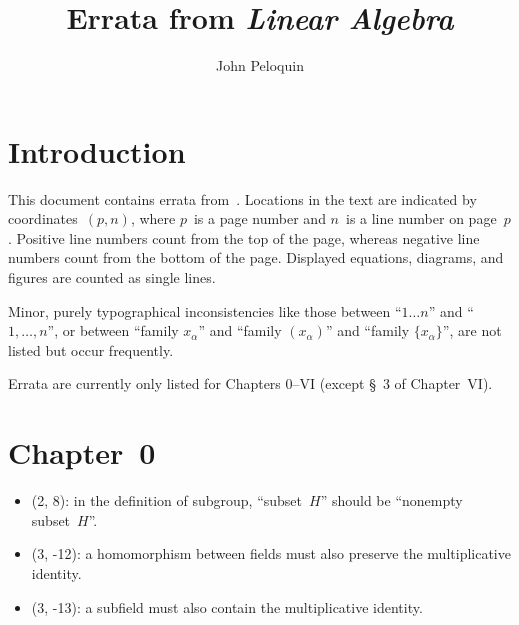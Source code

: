 \documentclass[letterpaper,12pt]{article}
\title{Errata from \textit{Linear Algebra}}
\author{John Peloquin}
\date{}
\begin{document}
\maketitle
\section*{Introduction}
This document contains errata from~\cite{greub}. Locations in the text are indicated by coordinates~\((p,n)\), where \(p\)~is a page number and \(n\)~is a line number on page~\(p\). Positive line numbers count from the top of the page, whereas negative line numbers count from the bottom of the page. Displayed equations, diagrams, and figures are counted as single lines.

Minor, purely typographical inconsistencies like those between ``\(1\ldots n\)'' and ``\(1,\ldots,n\)'', or between ``family \(x_{\alpha}\)'' and ``family \((x_{\alpha})\)'' and ``family \(\{x_{\alpha}\}\)'', are not listed but occur frequently.

Errata are currently only listed for Chapters 0--VI (except \S~3 of Chapter~VI).

\section*{Chapter~0}
\begin{itemize}
\item (2, 8): in the definition of subgroup, ``subset~\(H\)'' should be ``nonempty subset~\(H\)''.
\item (3, -12): a homomorphism between fields must also preserve the multiplicative identity.
\item (3, -13): a subfield must also contain the multiplicative identity.
\end{itemize}
\end{document}
